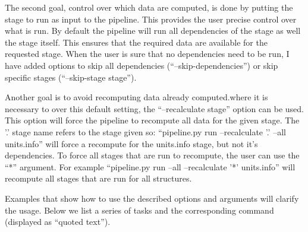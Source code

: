 The second goal, control over which data are computed, is done by putting the
stage to run as input to the pipeline. This provides the user precise control
over what is run. By default the pipeline will run all dependencies of the stage
as well the stage itself. This ensures that the required data are available for
the requested stage. When the user is sure that no dependencies need to be run,
I have added options to skip all dependencies (``--skip-dependencies'') or skip
specific stages (``--skip-stage stage'').

Another goal is to avoid recomputing data already computed.where it is necessary
to over this default setting, the ``--recalculate stage'' option can be used.
This option will force the pipeline to recompute all data for the given stage.
The '.' stage name refers to the stage given so: ``pipeline.py run
--recalculate '.' --all units.info'' will force a recompute for the units.info
stage, but not it's dependencies. To force all stages that are run to recompute,
the user can use the ``*'' argument. For example ``pipeline.py run --all
--recalculate '*' units.info'' will recompute all stages that are run for all
structures.

Examples that show how to use the described options and arguments will clarify
the usage. Below we list a series of tasks and the corresponding command
(displayed as ``quoted text'').

